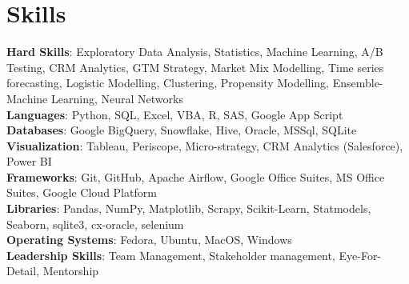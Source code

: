 \section{Skills}
  \begin{itemize}[leftmargin=0.1in, label={}]
    \normalsize{\item{
      \textbf{Hard Skills}: Exploratory Data Analysis, Statistics, Machine Learning, A/B Testing, CRM Analytics, GTM Strategy, Market Mix Modelling, Time series forecasting, Logistic Modelling, Clustering, Propensity Modelling, Ensemble-Machine Learning, Neural Networks \\
      \textbf{Languages}: Python, SQL, Excel, VBA, R, SAS, Google App Script\\
      \textbf{Databases}: Google BigQuery, Snowflake, Hive, Oracle, MSSql, SQLite \\
      \textbf{Visualization}: Tableau, Periscope, Micro-strategy, CRM Analytics (Salesforce), Power BI \\
      \textbf{Frameworks}: Git, GitHub, Apache Airflow, Google Office Suites, MS Office Suites, Google Cloud Platform \\
      \textbf{Libraries}: Pandas, NumPy, Matplotlib, Scrapy, Scikit-Learn, Statmodels, Seaborn, sqlite3, cx-oracle, selenium \\
      \textbf{Operating Systems}: Fedora, Ubuntu, MacOS, Windows \\
      \textbf{Leadership Skills}: Team Management, Stakeholder management, Eye-For-Detail, Mentorship \\
     }}
  \end{itemize}

